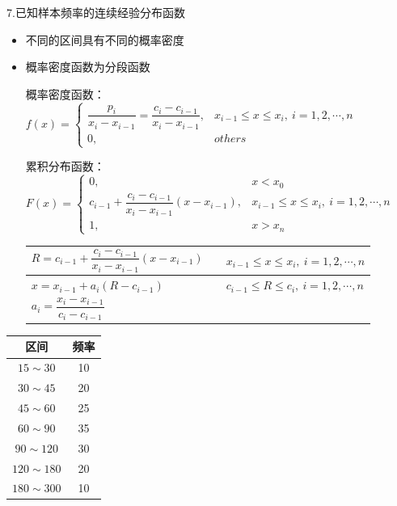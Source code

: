 \begin{example}
    7.\textcolor{thid2}{已知样本频率}\textcolor{thid1}{的连续经验分布函数}
    \begin{itemize}
        \item 不同的区间具有不同的\textcolor{thid1}{概率密度}
        \item 概率密度函数为分段函数
        
        概率密度函数：
        $
        f(x)=
        \left\{  
        \begin{array}{lr} 
            \dfrac{p_{i}}{x_{i}-x_{i-1}} =\dfrac{c_{i}-c_{i-1}}{x_{i}-x_{i-1}}   , &x_{i-1}\leqslant x \leqslant x_{i},\ i = 1,2,\cdots,n\\
            0, &others
        \end{array}  
        \right.  
        $
        
        累积分布函数：$
        F(x)=
        \left\{  
        \begin{array}{lr} 
            0, & x<x_{0}\\
            c_{i-1} + \dfrac{c_{i}-c_{i-1}}{x_{i}-x_{i-1}}(x-x_{i-1})  , &x_{i-1}\leqslant x \leqslant x_{i},\ i = 1,2,\cdots,n\\
            1, &x>x_{n}
        \end{array}  
        \right.  
        $
        \begin{table}[H]
            \centering
            \begin{tabular}{lll}
                \arrayrulecolor{red}
                $R = c_{i-1} + \dfrac{c_{i}-c_{i-1}}{x_{i}-x_{i-1}}(x-x_{i-1}) $                  &  & $x_{i-1}\leqslant x \leqslant x_{i},\ i = 1,2,\cdots,n$                       \\ \hline
                \multicolumn{1}{|l}{$x = x_{i-1}+a_{i} \left( R-c_{i-1} \right) $}                &  & \multicolumn{1}{l|}{$c_{i-1} \leqslant R \leqslant c_{i},\ i = 1,2,\cdots,n$} \\ \hline
                $ a_{i} = \dfrac{x_{i}-x_{i-1}}{c_{i}-c_{i-1}} $ &  &                                                                              
            \end{tabular}
        \end{table}
    \end{itemize}
\end{example}

\begin{table}
    
    \centering
    \begin{tabular}{cc}
        \hline
        区间            & 频率 \\ \hline
        $15\sim 30$   & 10 \\
        $30\sim 45$   & 20 \\
        $45\sim 60$   & 25 \\
        $60\sim 90$   & 35 \\
        $90\sim 120$  & 30 \\
        $120\sim 180$ & 20 \\
        $180\sim 300$ & 10 \\ \hline
    \end{tabular}
\end{table}

